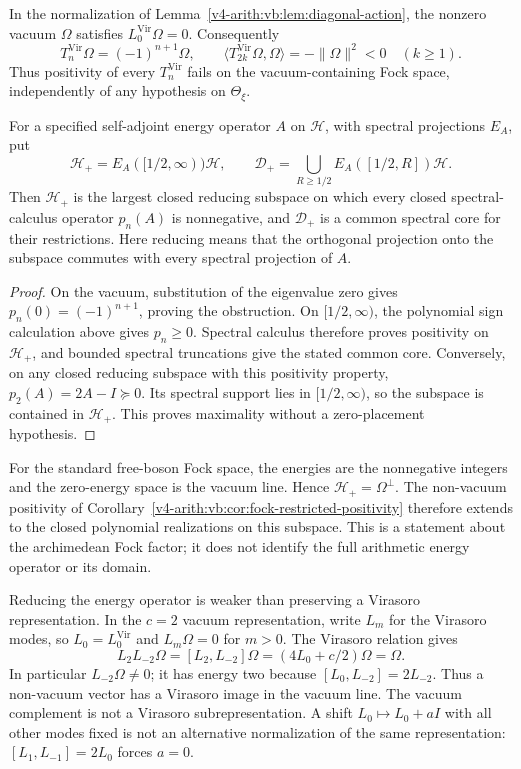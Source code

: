 \begin{proposition}
\label{v4-arith:sw:conj:VB-converse}
In the normalization of Lemma~\ref{v4-arith:vb:lem:diagonal-action}, the
nonzero vacuum \(\Omega\) satisfies \(L_0^{\mathrm{Vir}}\Omega=0\).
Consequently
\[
 T_n^{\mathrm{Vir}}\Omega=(-1)^{n+1}\Omega,
 \qquad
 \langle T_{2k}^{\mathrm{Vir}}\Omega,\Omega\rangle
 =-\|\Omega\|^2<0\quad(k\ge1).
\]
Thus positivity of every \(T_n^{\mathrm{Vir}}\) fails on the
vacuum-containing Fock space, independently of any hypothesis on
\(\Theta_\xi\).

For a specified self-adjoint energy operator \(A\) on \(\mathcal H\),
with spectral projections \(E_A\), put
\[
 \mathcal H_+=E_A([1/2,\infty))\mathcal H,
 \qquad
 \mathcal D_+=\bigcup_{R\ge1/2}E_A([1/2,R])\mathcal H.
\]
Then \(\mathcal H_+\) is the largest closed reducing subspace on which
every closed spectral-calculus operator \(p_n(A)\) is nonnegative,
and \(\mathcal D_+\) is a common spectral core for their restrictions.
Here reducing means that the orthogonal projection onto the subspace
commutes with every spectral projection of \(A\).
\end{proposition}

\begin{proof}
On the vacuum, substitution of the eigenvalue zero gives
\(p_n(0)=(-1)^{n+1}\), proving the obstruction. On
\([1/2,\infty)\), the polynomial sign calculation above gives
\(p_n\ge0\). Spectral calculus therefore proves positivity on
\(\mathcal H_+\), and bounded spectral truncations give the stated
common core. Conversely, on any closed reducing subspace with this
positivity property, \(p_2(A)=2A-I\succeq0\). Its spectral support
lies in \([1/2,\infty)\), so the subspace is contained in
\(\mathcal H_+\). This proves maximality without a zero-placement
hypothesis.
\end{proof}

For the standard free-boson Fock space, the energies are the
nonnegative integers and the zero-energy space is the vacuum line.
Hence \(\mathcal H_+=\Omega^\perp\). The non-vacuum positivity of
Corollary~\ref{v4-arith:vb:cor:fock-restricted-positivity} therefore extends to
the closed polynomial realizations on this subspace. This is a
statement about the archimedean Fock factor; it does not identify the
full arithmetic energy operator or its domain.

Reducing the energy operator is weaker than preserving a Virasoro
representation. In the \(c=2\) vacuum representation, write
\(L_m\) for the Virasoro modes, so \(L_0=L_0^{\mathrm{Vir}}\) and
\(L_m\Omega=0\) for \(m>0\). The Virasoro relation gives
\[
 L_2L_{-2}\Omega
 =[L_2,L_{-2}]\Omega
 =(4L_0+c/2)\Omega=\Omega.
\]
In particular \(L_{-2}\Omega\ne0\); it has energy two because
\([L_0,L_{-2}]=2L_{-2}\). Thus a non-vacuum vector has a Virasoro
image in the vacuum line. The vacuum complement is not a Virasoro
subrepresentation. A shift \(L_0\mapsto L_0+aI\) with all other
modes fixed is not an alternative normalization of the same
representation: \([L_1,L_{-1}]=2L_0\) forces \(a=0\).

